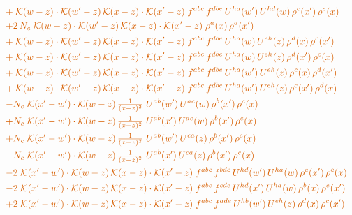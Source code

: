 \documentclass[10pt]{article}
\numberwithin{equation}{section}
\begin{document}
\begin{align}
&\quad{\color{BFK}+\;\mathcal{K}(w-z)\cdot\mathcal{K}(w'-z)\,\mathcal{K}(x-z)\cdot\mathcal{K}(x'-z)\;f^{abc}\,f^{dbe}\,U^{ha}(w')\,U^{hd}(w)\,\rho^{c}(x')\,\rho^{e}(x)}\notag\\
&\quad{\color{BFK}+2\,N_c\;\mathcal{K}(w-z)\cdot\mathcal{K}(w'-z)\,\mathcal{K}(x-z)\cdot\mathcal{K}(x'-z)\;\rho^{a}(x)\,\rho^{a}(x')}\notag\\
&\quad{\color{BFK}+\;\mathcal{K}(w-z)\cdot\mathcal{K}(w'-z)\,\mathcal{K}(x-z)\cdot\mathcal{K}(x'-z)\;f^{abc}\,f^{dbe}\,U^{ha}(w)\,U^{eh}(z)\,\rho^{d}(x)\,\rho^{c}(x')}\notag\\
&\quad{\color{BFK}+\;\mathcal{K}(w-z)\cdot\mathcal{K}(w'-z)\,\mathcal{K}(x-z)\cdot\mathcal{K}(x'-z)\;f^{abc}\,f^{dbe}\,U^{ha}(w)\,U^{eh}(z)\,\rho^{d}(x')\,\rho^{c}(x)}\notag\\
&\quad{\color{BFK}+\;\mathcal{K}(w-z)\cdot\mathcal{K}(w'-z)\,\mathcal{K}(x-z)\cdot\mathcal{K}(x'-z)\;f^{abc}\,f^{dbe}\,U^{ha}(w')\,U^{eh}(z)\,\rho^{c}(x)\,\rho^{d}(x')}\notag\\
&\quad{\color{BFK}+\;\mathcal{K}(w-z)\cdot\mathcal{K}(w'-z)\,\mathcal{K}(x-z)\cdot\mathcal{K}(x'-z)\;f^{abc}\,f^{dbe}\,U^{ha}(w')\,U^{eh}(z)\,\rho^{c}(x')\,\rho^{d}(x)}\notag\\
&\quad{\color{BFK}-N_c\;\mathcal{K}(x'-w')\cdot\mathcal{K}(w-z)\,\tfrac{1}{(x-z)^{2}}\;U^{ab}(w')\,U^{ac}(w)\,\rho^{b}(x')\,\rho^{c}(x)}\notag\\
&\quad{\color{BFK}+N_c\;\mathcal{K}(x'-w')\cdot\mathcal{K}(w-z)\,\tfrac{1}{(x-z)^{2}}\;U^{ab}(x')\,U^{ac}(w)\,\rho^{b}(x')\,\rho^{c}(x)}\notag\\
&\quad{\color{BFK}+N_c\;\mathcal{K}(x'-w')\cdot\mathcal{K}(w-z)\,\tfrac{1}{(x-z)^{2}}\;U^{ab}(w')\,U^{ca}(z)\,\rho^{b}(x')\,\rho^{c}(x)}\notag\\
&\quad{\color{BFK}-N_c\;\mathcal{K}(x'-w')\cdot\mathcal{K}(w-z)\,\tfrac{1}{(x-z)^{2}}\;U^{ab}(x')\,U^{ca}(z)\,\rho^{b}(x')\,\rho^{c}(x)}\notag\\
&\quad{\color{BFK}-2\;\mathcal{K}(x'-w')\cdot\mathcal{K}(w-z)\,\mathcal{K}(x-z)\cdot\mathcal{K}(x'-z)\;f^{abc}\,f^{bde}\,U^{hd}(w')\,U^{ha}(w)\,\rho^{e}(x')\,\rho^{c}(x)}\notag\\
&\quad{\color{BFK}-2\;\mathcal{K}(x'-w')\cdot\mathcal{K}(w-z)\,\mathcal{K}(x-z)\cdot\mathcal{K}(x'-z)\;f^{abc}\,f^{cde}\,U^{hd}(x')\,U^{ha}(w)\,\rho^{b}(x)\,\rho^{e}(x')}\notag\\
&\quad{\color{BFK}+2\;\mathcal{K}(x'-w')\cdot\mathcal{K}(w-z)\,\mathcal{K}(x-z)\cdot\mathcal{K}(x'-z)\;f^{abc}\,f^{ade}\,U^{hb}(w')\,U^{eh}(z)\,\rho^{d}(x)\,\rho^{c}(x')}\notag\\

\end{align}
\end{document}
